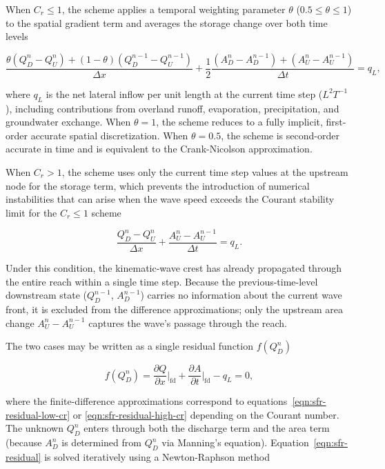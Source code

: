 When $C_r \le 1$, the scheme applies a temporal weighting parameter $\theta$ ($0.5 \le \theta \le 1$) to the spatial gradient term and averages the storage change over both time levels

\begin{equation}
	\label{eqn:sfr-residual-low-cr}
	\frac{\theta \left( Q_D^n - Q_U^n \right) + \left(1 - \theta \right) \left( Q_D^{n-1} - Q_U^{n-1} \right)}{\Delta x}
	+ \frac{1}{2} \frac{\left( A_D^n - A_D^{n-1} \right) + \left( A_U^n - A_U^{n-1} \right)}{\Delta t} = q_L ,
\end{equation}

\noindent where $q_L$ is the net lateral inflow per unit length at the current time step ($L^2T^{-1}$), including contributions from overland runoff, evaporation, precipitation, and groundwater exchange. When $\theta = 1$, the scheme reduces to a fully implicit, first-order accurate spatial discretization. When $\theta = 0.5$, the scheme is second-order accurate in time and is equivalent to the Crank-Nicolson approximation.

When $C_r > 1$, the scheme uses only the current time step values at the upstream node for the storage term, which prevents the introduction of numerical instabilities that can arise when the wave speed exceeds the Courant stability limit for the $C_r \le 1$ scheme

\begin{equation}
	\label{eqn:sfr-residual-high-cr}
	\frac{Q_D^n - Q_U^n}{\Delta x} + \frac{A_U^n - A_U^{n-1}}{\Delta t} = q_L .
\end{equation}

\noindent Under this condition, the kinematic-wave crest has already propagated through the entire reach within a single time step. Because the previous-time-level downstream state ($Q_D^{n-1}$, $A_D^{n-1}$) carries no information about the current wave front, it is excluded from the difference approximations; only the upstream area change $A_U^n - A_U^{n-1}$ captures the wave's passage through the reach.

The two cases may be written as a single residual function $f(Q_D^n)$

\begin{equation}
	\label{eqn:sfr-residual}
	f \left( Q_D^n \right) = \frac{\partial Q}{\partial x}\bigg|_\mathrm{fd} + \frac{\partial A}{\partial t}\bigg|_\mathrm{fd} - q_L = 0 ,
\end{equation}

\noindent where the finite-difference approximations correspond to equations~\ref{eqn:sfr-residual-low-cr} or \ref{eqn:sfr-residual-high-cr} depending on the Courant number. The unknown $Q_D^n$ enters through both the discharge term and the area term (because $A_D^n$ is determined from $Q_D^n$ via Manning's equation). Equation~\ref{eqn:sfr-residual} is solved iteratively using a Newton-Raphson method

